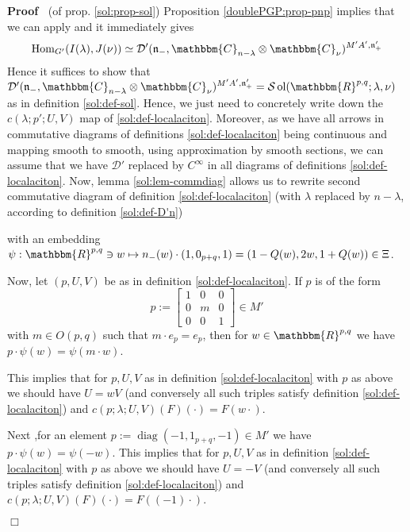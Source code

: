 \documentclass{article}
\newcommand{\assign}{:=}
\newcommand{\tmop}[1]{\ensuremath{\operatorname{#1}}}
\renewenvironment{proof}{\noindent\textbf{Proof\ }}{\hspace*{\fill}$\Box$\medskip}
\theoremstyle{remark}
\newcommand{\C}{\ensuremath{\mathbbm{C}}}
\begin{document}
\begin{proof}
  (of prop. \ref{sol:prop-sol}) Proposition \ref{doublePGP:prop-pnp} implies
  that we can apply {\cite[thm. 3.16]{kobayashi2015symmetry}} and it
  immediately gives
  \[ \tmop{Hom}_{G'} (I (\lambda), J (\nu)) \simeq \mathcal{D}'
     (\mathfrak{n}_-, \mathbbm{C}_{n - \lambda} \otimes \mathbbm{C}_{\nu})^{M'
     A', \mathfrak{n}'_+} \]
  Hence it suffices to show that $\mathcal{D}' (\mathfrak{n}_-, \mathbbm{C}_{n
  - \lambda} \otimes \mathbbm{C}_{\nu})^{M' A', \mathfrak{n}'_+} =\mathcal{S}
  \tmop{ol} (\mathbbm{R}^{p, q} ; \lambda, \nu)$ as in definition
  \ref{sol:def-sol}. Hence, we just need to concretely write down the $c
  (\lambda ; p' ; U, V)$ map of \ref{sol:def-localaciton}. Moreover, as we
  have all arrows in commutative diagrams of definitions
  \ref{sol:def-localaciton} being continuous and mapping smooth to smooth,
  using approximation by smooth sections, we can assume that we have
  $\mathcal{D}'$ replaced by $C^{\infty}$ in all diagrams of definitions
  \ref{sol:def-localaciton}. Now, lemma \ref{sol:lem-commdiag} allows us to
  rewrite second commutative diagram of definition \ref{sol:def-localaciton}
  (with $\lambda$ replaced by $n - \lambda$, according to definition
  \ref{sol:def-D'n})
  
  \centerline{ }
  
  with an embedding $\psi : \mathbbm{R}^{p, q} \ni w \mapsto n_- (w) \cdot (1,
  0_{p + q}, 1) = (1 - Q (w), 2 w, 1 + Q (w)) \in \Xi$.
  
  Now, let $(p, U, V)$ be as in definition \ref{sol:def-localaciton}. If $p$
  is of the form
  \[ p \assign \left[ \begin{array}{ccc}
       1 & 0 & 0\\
       0 & m & 0\\
       0 & 0 & 1
     \end{array} \right] \in M' \]
  with $m \in O (p, q)$ such that $m \cdot e_p = e_p$, then for $w \in
  \mathbbm{R}^{p, q}$ we have $p \cdot \psi (w) = \psi (m \cdot w)$.
  
  This implies that for $p, U, V$ as in definition \ref{sol:def-localaciton}
  with $p$ as above we should have $U = w V$ (and conversely all such triples
  satisfy definition \ref{sol:def-localaciton}) and $c (p ; \lambda ; U, V)
  (F) (\cdot) = F (w \cdot)$.
  
  Next ,for an element $p \assign \tmop{diag} (- 1, 1_{p + q}, - 1) \in M'$ we
  have $p \cdot \psi (w) = \psi (- w)$. This implies that for $p, U, V$ as in
  definition \ref{sol:def-localaciton} with $p$ as above we should have $U = -
  V$ (and conversely all such triples satisfy definition
  \ref{sol:def-localaciton}) and $c (p ; \lambda ; U, V) (F) (\cdot) = F ((-
  1) \cdot)$.
  

\end{proof}
\end{document}
